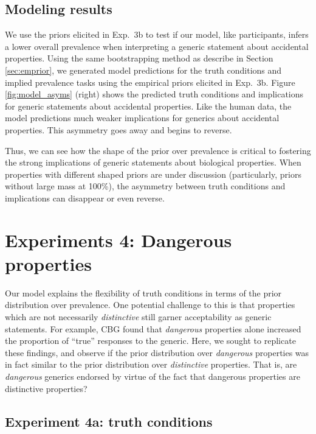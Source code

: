 \documentclass[10pt,letterpaper]{article}
\begin{document}
\subsection{Modeling results}

We use the priors elicited in Exp.~3b to test if our model, like participants, infers a lower overall prevalence when interpreting a generic statement about accidental properties. Using the same bootstrapping method as describe in Section \ref{sec:emprior}, we generated model predictions for the truth conditions and implied prevalence tasks using the empirical priors elicited in Exp.~3b. Figure \ref{fig:model_asyms} (right) shows the predicted truth conditions and implications for generic statements about accidental properties. Like the human data, the model predictions much weaker implications for generics about accidental properties. This asymmetry goes away and begins to reverse.

Thus, we can see how the shape of the prior over prevalence is critical to fostering the strong implications of generic statements about biological properties. When properties with different shaped priors are under discussion (particularly, priors without large mass at 100\%), the asymmetry between truth conditions and implications can disappear or even reverse.

\section{Experiments 4: Dangerous properties}

Our model explains the flexibility of truth conditions in terms of the prior distribution over prevalence. One potential challenge to this is that properties which are not necessarily \emph{distinctive} still garner acceptability as generic statements. For example, CBG found that \emph{dangerous} properties alone increased the proportion of ``true'' responses to the generic. Here, we sought to replicate these findings, and observe if the prior distribution over \emph{dangerous} properties was in fact similar to the prior distribution over \emph{distinctive} properties. That is, are \emph{dangerous} generics endorsed by virtue of the fact that dangerous properties are distinctive properties?

\subsection{Experiment 4a: truth conditions}
\end{document}
